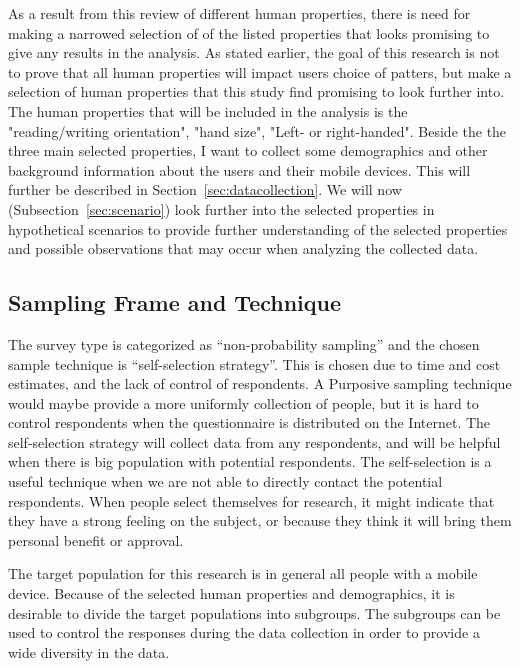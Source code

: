    As a result from this review of different human properties, there is need for making a narrowed selection of of the listed properties that looks promising to give any results in the analysis. As stated earlier, the goal of this research is not to prove that all human properties will impact users choice of patters, but make a selection of human properties that this study find promising to look further into. The human properties that will be included in the analysis is the  "reading/writing orientation", "hand size", "Left- or right-handed". Beside the the three main selected properties, I want to collect some demographics and other background information about the users and their mobile devices. This will further be described in Section~\ref{sec:datacollection}. We will now (Subsection~\ref{sec:scenario}) look further into the selected properties in hypothetical scenarios to provide further understanding of the selected properties and possible observations that may occur when analyzing the collected data. 

    \subsection{Sampling Frame and Technique} \label{sec:sampling}
      
      The survey type is categorized as ``non-probability sampling'' and the chosen sample technique is ``self-selection strategy''. This is chosen due to time and cost estimates, and the lack of control of respondents. A Purposive sampling technique would maybe provide a more uniformly collection of people, but it is hard to control respondents when the questionnaire is distributed on the Internet. The self-selection strategy will collect data from any respondents, and will be helpful when there is big population with potential respondents. The self-selection is a useful technique when we are not able to directly contact the potential respondents. When people select themselves for research, it might indicate that they have a strong feeling on the subject, or because they think it will bring them personal benefit or approval. 

      The target population for this research is in general all people with a mobile device. Because of the selected human properties and demographics, it is desirable to divide the target populations into subgroups. The subgroups can be used to control the responses during the data collection in order to provide a wide diversity in the data. 

